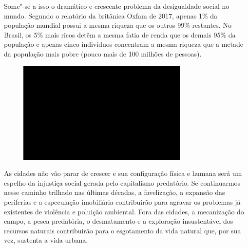 Some"-se a isso o dramático e crescente problema da desigualdade social
no mundo. Segundo o relatório da  britânica Oxfam de 2017, apenas 1\%
da população mundial possui a mesma riqueza que os outros 99\%
restantes. No Brasil, os 5\% mais ricos detêm a mesma fatia de renda que
os demais 95\% da população e apenas cinco indivíduos concentram a mesma
riqueza que a metade da população mais pobre (pouco mais de 100 milhões
de pessoas).

\begin{figure}[!ht]

\centering
 \includegraphics[width=85mm]{./imgs/im1.jpg}
\caption{\tiny{}}

\end{figure}

As cidades não vão parar de
crescer e sua configuração física e humana será um espelho da injustiça
social gerada pelo capitalismo predatório. Se continuarmos nesse caminho
trilhado nas últimas décadas, a favelização, a expansão das periferias e
a especulação imobiliária contribuirão para agravar os problemas já
existentes de violência e poluição ambiental. Fora das cidades, a
mecanização do campo, a pesca predatória, o desmatamento e a exploração
insustentável dos recursos naturais contribuirão para o esgotamento da
vida natural que, por sua vez, sustenta a vida urbana.

